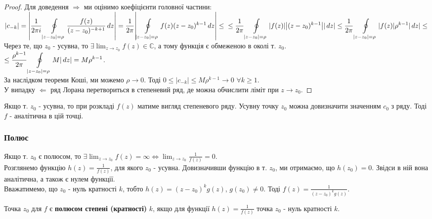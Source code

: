 \documentclass{math_library}
\begin{document}
\begin{proof}
Для доведення $\boxed{\Rightarrow}$ ми оцінимо коефіцієнти головної частини:\\
	 $\displaystyle \abs{c_{-k}} = \abs{\frac{1}{2 \pi i}\oint\displaylimits_{|z-z_0|=\rho} \frac{f(z)}{(z-z_0)^{-k+1}} \,dz} = \frac{1}{2 \pi}\abs{\oint\displaylimits_{|z-z_0|=\rho} f(z)(z-z_0)^{k-1} \,dz} \leq \\ \leq \frac{1}{2 \pi}\oint\displaylimits_{|z-z_0|=\rho} \abs{f(z)} \abs{(z-z_0)^{k-1}} \abs{\,dz} \leq \frac{1}{2 \pi}\oint\displaylimits_{|z-z_0|=\rho} \abs{f(z)} \rho^{k-1} \abs{\,dz} \leq$\\
	 Через те, що $z_0$ - усувна, то $\displaystyle\exists \lim_{z \to z_0} f(z) \in \mathbb{C}$, а тому функція є обмеженою в околі т. $z_0$.\\
	 $\leq \displaystyle \frac{\rho^{k-1}}{2 \pi}\oint\displaylimits_{|z-z_0|=\rho} M  \abs{\,dz} = M \rho^{k-1}$.\\
За наслідком теореми Коші, ми можемо $\rho \to 0$. Тоді $0\leq|c_{-k}|\leq M \rho^{k-1} \to 0$ $\forall k \geq 1$.
\bigskip \\
У випадку $\boxed{\Leftarrow}$ ряд Лорана перетвориться в степеневий ряд, де можна обчислити ліміт при $z \to z_0$.
\end{proof}

\begin{corollary}
Якщо т. $z_0$ - усувна, то при розкладі $f(z)$ матиме вигляд степеневого ряду. Усувну точку $z_0$ можна довизначити значенням $c_0$ з ряду. Тоді $f$ - аналітична в цій точці.
\end{corollary}

	 
\subsubsection{Полюс}
Якщо т. $z_0$ є полюсом, то $\displaystyle\exists \lim_{z \to z_0} f(z) = \infty \iff \lim_{z \to z_0} \frac{1}{f(z)} = 0$.\\
	 Розглянемо функцію $h(z) = \displaystyle \frac{1}{f(z)}$, для якого $z_0$ - усувна. Довизначивши функцію в т. $z_0$, ми отримаємо, що $h(z_0) = 0$. Звідси в ній вона аналітична, а також є нулем функції.\\
	 Вважатимемо, що $z_0$ - нуль кратності $k$, тобто $h(z)=(z-z_0)^k g(z)$, $g(z_0) \neq 0$. Тоді $\displaystyle f(z)=\frac{1}{(z-z_0)^k g(z)}$.
	 
\begin{definition}
Точка $z_0$ для $f$ є \textbf{полюсом степені (кратності)} $k$, якщо для функції $\displaystyle h(z)=\frac{1}{f(z)}$ точка $z_0$ - нуль кратності $k$.
\end{definition}
\end{document}
